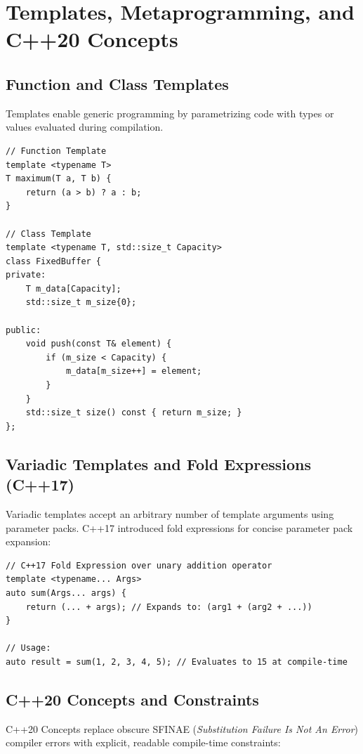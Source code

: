 \documentclass[10pt,journal,compsoc,onecolumn]{IEEEtran}
\begin{document}
\section{Templates, Metaprogramming, and C++20 Concepts}
\label{sec:templates}

\subsection{Function and Class Templates}
Templates enable generic programming by parametrizing code with types or values evaluated during compilation.

\begin{verbatim}
// Function Template
template <typename T>
T maximum(T a, T b) {
    return (a > b) ? a : b;
}

// Class Template
template <typename T, std::size_t Capacity>
class FixedBuffer {
private:
    T m_data[Capacity];
    std::size_t m_size{0};

public:
    void push(const T& element) {
        if (m_size < Capacity) {
            m_data[m_size++] = element;
        }
    }
    std::size_t size() const { return m_size; }
};
\end{verbatim}

\subsection{Variadic Templates and Fold Expressions (C++17)}
Variadic templates accept an arbitrary number of template arguments using parameter packs. C++17 introduced fold expressions for concise parameter pack expansion:

\begin{verbatim}
// C++17 Fold Expression over unary addition operator
template <typename... Args>
auto sum(Args... args) {
    return (... + args); // Expands to: (arg1 + (arg2 + ...))
}

// Usage:
auto result = sum(1, 2, 3, 4, 5); // Evaluates to 15 at compile-time
\end{verbatim}

\subsection{C++20 Concepts and Constraints}
C++20 Concepts replace obscure SFINAE (\emph{Substitution Failure Is Not An Error}) compiler errors with explicit, readable compile-time constraints:
\end{document}
